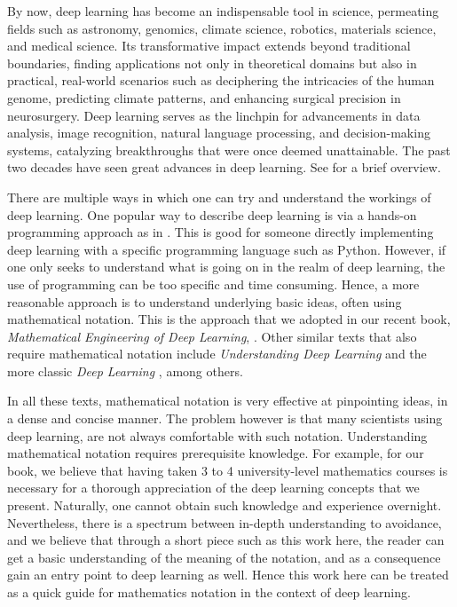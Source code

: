By now, deep learning has become an indispensable tool in science, permeating fields such as astronomy, genomics, climate science, robotics, materials science, and medical science. Its transformative impact extends beyond traditional boundaries, finding applications not only in theoretical domains but also in practical, real-world scenarios such as deciphering the intricacies of the human genome, predicting climate patterns, and enhancing surgical precision in neurosurgery. Deep learning serves as the linchpin for advancements in data analysis, image recognition, natural language processing, and decision-making systems, catalyzing breakthroughs that were once deemed unattainable. The past two decades have seen great advances in deep learning. See \cite{lecun2015deep} for a brief overview.

There are multiple ways in which one can try and understand the workings of deep learning. One popular way to describe deep learning is via a hands-on programming approach as in \cite{howard2020deep}. This is good for someone directly implementing deep learning with a specific programming language such as Python. However, if one only seeks to understand what is going on in the realm of deep learning, the use of programming can be too specific and time consuming. Hence, a more reasonable approach is to understand underlying basic ideas, often using mathematical notation. This is the approach that we adopted in our recent book, {\em Mathematical Engineering of Deep Learning}, \cite{LiquetMokaNazarathy2024DeepLearning}. Other similar texts that also require mathematical notation include {\em Understanding Deep Learning
} \cite{prince2023understanding} and the more classic {\em Deep Learning} \cite{goodfellow2016deep}, among others. 

In all these texts, mathematical notation is very effective at pinpointing ideas, in a dense and concise manner. The problem however is that many scientists using deep learning, are not always comfortable with such notation. Understanding mathematical notation requires prerequisite knowledge. For example, for our book, we believe that having taken 3 to 4 university-level mathematics courses is necessary for a thorough appreciation of the deep learning concepts that we present. Naturally, one cannot obtain such knowledge and experience overnight. Nevertheless, there is a spectrum between in-depth understanding to avoidance, and we believe that through a short piece such as this work here, the reader can get a basic understanding of the meaning of the notation, and as a consequence gain an entry point to deep learning as well. Hence this work here can be treated as a quick guide for mathematics notation in the context of deep learning.

